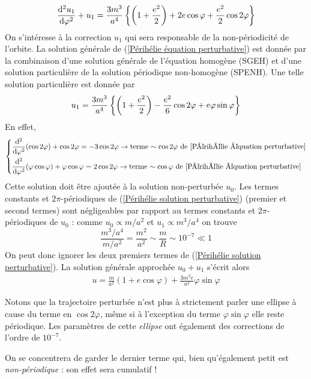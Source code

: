 \begin{align}
    \label{Périhélie équation perturbative}
    \frac{\mathrm{d}^2 u_1}{\mathrm{d} \varphi^2} + u_1  = \frac{3m^3}{a^4} \left\{ \left( 1+ \frac{e^2}{2} \right) + 2e \cos\varphi + \frac{e^2}{2} \cos 2\varphi \right\}
\end{align}
On s'intéresse à la correction $u_1$ qui sera responsable de la non-périodicité de l'orbite. La solution générale de (\ref{Périhélie équation perturbative}) est donnée par la combinaison d'une solution générale de l'équation homogène (SGEH) et d'une solution particulière de la solution périodique non-homogène (SPENH). Une telle solution particulière est donnée par
\begin{equation}
    \label{Périhélie solution perturbative}
    u_1 = \frac{3m^3}{a^4} \left\{ \left( 1 + \frac{e^2}{2} \right) - \frac{e^2}{6} \cos 2 \varphi + e \varphi \sin \varphi \right\}
\end{equation}
En effet,
\begin{align}
    \begin{dcases}
        \frac{\mathrm{d}^2}{\mathrm{d}\varphi^2} (\cos 2 \varphi) + \cos 2\varphi = -3 \cos 2 \varphi \to \text{terme $\sim \cos 2 \varphi$ de \ref{Périhélie équation perturbative}}\\
        \frac{\mathrm{d}^2}{\mathrm{d}\varphi^2} (\varphi \cos \varphi) + \varphi\cos \varphi = 2 \cos 2 \varphi \to \text{terme $\sim \cos \varphi$ de \ref{Périhélie équation perturbative}}\\
    \end{dcases}
\end{align}
Cette solution doit être ajoutée à la solution non-perturbée $u_0$. Les termes constants et $2\pi$-périodiques de (\ref{Périhélie solution perturbative}) (premier et second termes) sont négligeables par rapport au termes constants et $2\pi$-périodiques de $u_0$ : comme $u_0 \propto m/a^2$ et $u_1 \propto m^3/a^4$ on trouve
\begin{equation}
    \frac{m^3/a^4}{m/a^2} = \frac{m^2}{a^2} \sim \frac{m}{R} \sim 10^{-7} \ll 1
\end{equation}
On peut donc ignorer les deux premiers termes de (\ref{Périhélie solution perturbative}). La solution générale approchée $u_0+u_1$ s'écrit alors
\begin{align}
    \label{Périhélie solution générale}
    \boxed{u = \frac{m}{a^2} (1+ e\cos \varphi ) + \frac{3m^3e}{a^4}\varphi \sin \varphi}
\end{align}
\begin{rmk}
    Notons que la trajectoire perturbée n'est plus à strictement parler une ellipse à cause du terme en $\cos 2 \varphi$, même si à l'exception du terme $\varphi \sin\varphi$ elle reste périodique. Les paramètres de cette \emph{ellipse} ont également des corrections de l'ordre de $10^{-7}$.
\end{rmk}
On se concentrera de garder le dernier terme qui, bien qu'également petit est \emph{non-périodique} : son effet sera cumulatif !

